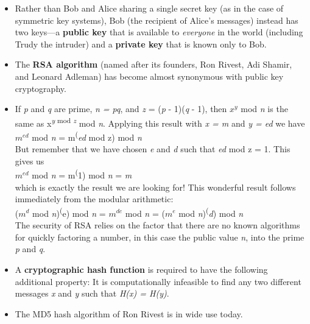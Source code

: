 \begin{itemize}
\item
Rather than Bob and Alice sharing a single secret key (as in the case of symmetric key systems), Bob (the recipient of Alice's messages) instead has two keys---a \textbf{public key} that is available to \textit{everyone} in the world (including Trudy the intruder) and a \textbf{private key} that is known only to Bob.

\item
The \textbf{RSA algorithm} (named after its founders, Ron Rivest, Adi Shamir, and Leonard Adleman) has become almost synonymous with public key cryptography.

\item
If \textit{p} and \textit{q} are prime, \textit{n = pq}, and \textit{z} = (\textit{p} - 1)(\textit{q} - 1), then \(x^y\) mod \textit{n} is the same as x\textsuperscript{\textit{y} mod \textit{z}} mod \textit{n}. Applying this result with \textit{x = m} and \textit{y = ed} we have\\
\hspace*{1em}\(m^{ed}\) mod \textit{n} = m\textsuperscript(\textit{ed} mod z) mod \textit{n}\\
But remember that we have chosen \textit{e} and \textit{d} such that \textit{ed} mod z = 1. This gives us\\
\hspace*{1em}\(m^{ed}\) mod \textit{n} = m\textsuperscript(1) mod \textit{n} = \textit{m}\\
which is exactly the result we are looking for! This wonderful result follows immediately from the modular arithmetic:\\
\hspace*{1em}(\(m^d\) mod \textit{n})\textsuperscript(e) mod \textit{n} = \(m^{de}\) mod \textit{n} = (\(m^e\) mod \textit{n})\textsuperscript(\textit{d}) mod \textit{n}\\
The security of RSA relies on the factor that there are no known algorithms for quickly factoring a number, in this case the public value \textit{n}, into the prime \textit{p} and \textit{q}.

\item
A \textbf{cryptographic hash function} is required to have the following additional property: It is computationally infeasible to find any two different messages \textit{x} and \textit{y} such that \textit{H(x) = H(y)}.

\item
The MD5 hash algorithm of Ron Rivest is in wide use today.


\end{itemize}
